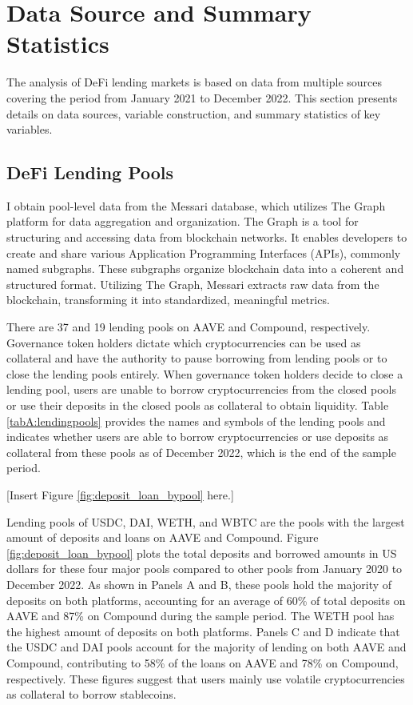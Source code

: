 \documentclass[12pt]{article}
\begin{document}
\section{Data Source and Summary Statistics}\label{sec:emp_data}


The analysis of DeFi lending markets is based on data from multiple sources covering the period from January 2021 to December 2022. This section presents details on data sources, variable construction, and summary statistics of key variables.
\subsection{DeFi Lending Pools}
I obtain pool-level data from the Messari database, which utilizes The Graph platform for data aggregation and organization. The Graph is a tool for structuring and accessing data from blockchain networks. It enables developers to create and share various Application Programming Interfaces (APIs), commonly named subgraphs. These subgraphs organize blockchain data into a coherent and structured format. Utilizing The Graph, Messari extracts raw data from the blockchain, transforming it into standardized, meaningful metrics.

There are 37 and 19 lending pools on AAVE and Compound, respectively. Governance token holders dictate which cryptocurrencies can be used as collateral and have the authority to pause borrowing from lending pools or to close the lending pools entirely. When governance token holders decide to close a lending pool, users are unable to borrow cryptocurrencies from the closed pools or use their deposits in the closed pools as collateral to obtain liquidity. Table \ref{tabA:lendingpools} provides the names and symbols of the lending pools and indicates whether users are able to borrow cryptocurrencies or use deposits as collateral from these pools as of December 2022, which is the end of the sample period.

\centerline{[Insert Figure \ref{fig:deposit_loan_bypool} here.]}

Lending pools of USDC, DAI, WETH, and WBTC are the pools with the largest amount of deposits and loans on AAVE and Compound. Figure \ref{fig:deposit_loan_bypool} plots the total deposits and borrowed amounts in US dollars for these four major pools compared to other pools from January 2020 to December 2022. As shown in Panels A and B, these pools hold the majority of deposits on both platforms, accounting for an average of 60\% of total deposits on AAVE and 87\% on Compound during the sample period. The WETH pool has the highest amount of deposits on both platforms. Panels C and D indicate that the USDC and DAI pools account for the majority of lending on both AAVE and Compound, contributing to 58\% of the loans on AAVE and 78\% on Compound, respectively. These figures suggest that users mainly use volatile cryptocurrencies as collateral to borrow stablecoins. 
\end{document}
